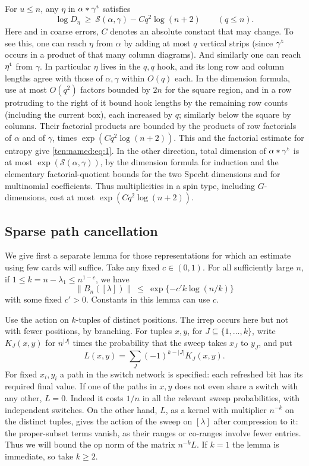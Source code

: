 For \(u\le n\), any \(\eta\) in \(\alpha*\gamma^{\rm t}\) satisfies
\begin{equation}
 \log D_\eta\ \ge\ \mathcal S(\alpha,\gamma)-C q^2\log(n+2)
 \qquad (q\le n).
 \label{ten:named:eq:1}
\end{equation}
Here and in coarse errors, \(C\) denotes an absolute constant that may change. To see this, one can reach \(\eta\) from \(\alpha\) by adding at most \(q\) vertical strips (since \(\gamma^{\rm t}\) occurs in a product of that many column diagrams). And similarly one can reach \(\eta^{\rm t}\) from \(\gamma\). In particular \(\eta\) lives in the \(q,q\) hook, and its long row and column lengths agree with those of \(\alpha,\gamma\) within \(O(q)\) each. In the dimension formula, use at most \(O(q^2)\) factors bounded by \(2n\) for the square region, and in a row protruding to the right of it bound hook lengths by the remaining row counts (including the current box), each increased by \(q\); similarly below the square by columns. Their factorial products are bounded by the products of row factorials of \(\alpha\) and of \(\gamma\), times \(\exp(C q^2\log(n+2))\). This and the factorial estimate for entropy give \eqref{ten:named:eq:1}. In the other direction, total dimension of \(\alpha*\gamma^{\rm t}\) is at most \(\exp(\mathcal S(\alpha,\gamma))\), by the dimension formula for induction and the elementary factorial-quotient bounds for the two Specht dimensions and for multinomial coefficients. Thus multiplicities in a spin type, including \(G\)-dimensions, cost at most \(\exp(C q^2\log(n+2))\).

\subsection{Sparse path cancellation}
We give first a separate lemma for those representations for which an estimate using few cards will suffice. Take any fixed \(c\in(0,1)\). For all sufficiently large \(n\), if \(1\le k=n-\lambda_1\le n^{1-c}\), we have
\begin{equation}
 \|B_n([\lambda])\|\ \le\ \exp\{-c' k\log(n/k)\}
 \label{ten:named:eq:2}
\end{equation}
with some fixed \(c'>0\). Constants in this lemma can use \(c\).

Use the action on \(k\)-tuples of distinct positions. The irrep occurs here but not with fewer positions, by branching. For tuples \(x,y\), for \(J\subseteq\{1,\ldots,k\}\), write \(K_J(x,y)\) for \(n^{|J|}\) times the probability that the sweep takes \(x_J\) to \(y_J\), and put
\[
 L(x,y)=\sum_J(-1)^{k-|J|} K_J(x,y).
\]
For fixed \(x_i,y_i\) a path in the switch network is specified: each refreshed bit has its required final value. If one of the paths in \(x,y\) does not even share a switch with any other, \(L=0\). Indeed it costs \(1/n\) in all the relevant sweep probabilities, with independent switches. On the other hand, \(L\), as a kernel with multiplier \(n^{-k}\) on the distinct tuples, gives the action of the sweep on \([\lambda]\) after compression to it: the proper-subset terms vanish, as their ranges or co-ranges involve fewer entries. Thus we will bound the op norm of the matrix \(n^{-k}L\). If \(k=1\) the lemma is immediate, so take \(k\ge 2\).


